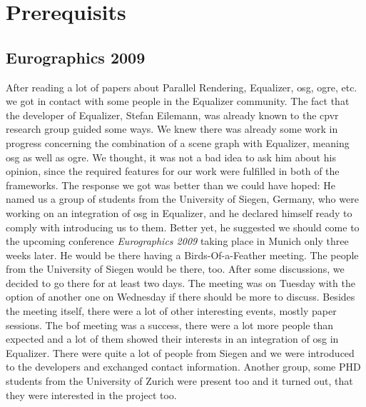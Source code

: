 
\chapter{Prerequisits}

\section{Eurographics 2009}
After reading a lot of papers about Parallel Rendering, Equalizer, \gls{osg}, \gls{ogre}, etc. we got in contact with some people in the Equalizer community. The fact that the developer of Equalizer, Stefan Eilemann, was already known to the \gls{cpvr} research group guided some ways. We knew there was already some work in progress concerning the combination of a scene graph with Equalizer, meaning \gls{osg} as well as \gls{ogre}. We thought, it was not a bad idea to ask him about his opinion, since the required features for our work were fulfilled in both of the frameworks. The response we got was better than we could have hoped: He named us a group of students from the University of Siegen, Germany, who were working on an integration of \gls{osg} in Equalizer, and he declared himself ready to comply with introducing us to them. Better yet, he suggested we should come to the upcoming conference \emph{Eurographics 2009} taking place in Munich only three weeks later. He would be there having a Birds-Of-a-Feather meeting. The people from the University of Siegen would be there, too. 
After some discussions, we decided to go there for at least two days. The meeting was on Tuesday with the option of another one on Wednesday if there should be more to discuss.
Besides the meeting itself, there were a lot of other interesting events, mostly paper sessions. The \gls{bof} meeting was a success, there were a lot more people than expected and a lot of them showed their interests in an integration of \gls{osg} in Equalizer. There were quite a lot of people from Siegen and we were introduced to the developers and exchanged contact information. Another group, some PHD students from the University of Zurich were present too and it turned out, that they were interested in the project too. 


